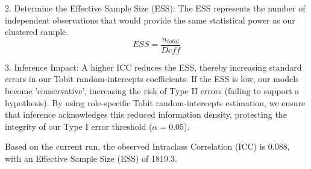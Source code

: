 \documentclass[11pt]{article}
\begin{document}
2. Determine the Effective Sample Size (ESS): The ESS represents the number of independent observations that would provide the same statistical power as our clustered sample.
$$ESS = \frac{n_{total}}{Deff}$$

3. Inference Impact: A higher ICC reduces the ESS, thereby increasing standard errors in our Tobit random-intercepts coefficients. 
If the ESS is low, our models become 'conservative', increasing the risk of Type II errors (failing to support a hypothesis). 
By using role-specific Tobit random-intercepts estimation, we ensure that inference acknowledges this reduced information density, protecting the integrity of our Type I error threshold ($\alpha = 0.05$).

Based on the current run, the observed Intraclass Correlation (ICC) is 0.088, with an Effective Sample Size (ESS) of 1819.3.
\end{document}
